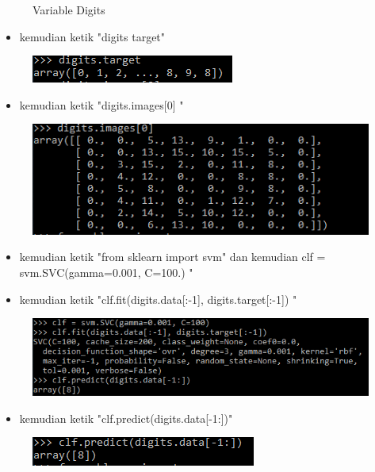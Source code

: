 \begin{enumerate}
\begin{figure}[ht]
\caption{Variable Digits}
\end{figure}
\begin{itemize}
\item kemudian  ketik "digits target"
\end{itemize}
\begin{figure}[ht]
\centering
\includegraphics[scale=0.5]{figures/puad5.png}
\caption{}
\end{figure}
\begin{itemize}
\item kemudian  ketik "digits.images[0] "
\end{itemize}
\begin{figure}[ht]
\centering
\includegraphics[scale=0.5]{figures/puad6.png}
\caption{}
\end{figure}
\begin{itemize}
\item kemudian  ketik "from sklearn import svm" dan kemudian clf = svm.SVC(gamma=0.001, C=100.) "
\item kemudian  ketik "clf.fit(digits.data[:-1], digits.target[:-1]) "
\end{itemize}
\begin{figure}[ht]
\centering
\includegraphics[scale=0.5]{figures/puad7.png}
\caption{}
\end{figure}
\begin{itemize}
\item kemudian  ketik "clf.predict(digits.data[-1:])"
\end{itemize}
\begin{figure}[ht]
\centering
\includegraphics[scale=0.5]{figures/puad8.png}

\end{figure}
\end{enumerate}

